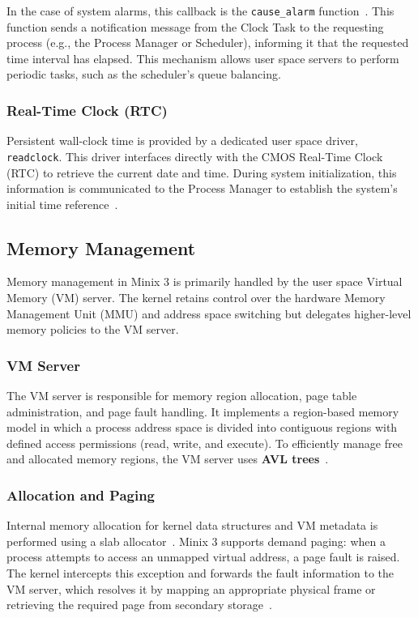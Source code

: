 \documentclass[a4paper,10pt,twoside]{report}
\theoremstyle{definition}
\begin{document}
In the case of system alarms, this callback is the \texttt{cause\_alarm} function~\cite{minix_do_setalarm}. This function sends a notification message from the Clock Task to the requesting process (e.g., the Process Manager or Scheduler), informing it that the requested time interval has elapsed. This mechanism allows user space servers to perform periodic tasks, such as the scheduler's queue balancing.

\subsubsection{Real-Time Clock (RTC)}
Persistent wall-clock time is provided by a dedicated user space driver, \texttt{readclock}. This driver interfaces directly with the CMOS Real-Time Clock (RTC) to retrieve the current date and time. During system initialization, this information is communicated to the Process Manager to establish the system's initial time reference~\cite{minix_readclock}.

\subsection{Memory Management}
Memory management in Minix 3 is primarily handled by the user space Virtual Memory (VM) server. The kernel retains control over the hardware Memory Management Unit (MMU) and address space switching but delegates higher-level memory policies to the VM server.

\subsubsection{VM Server}
The VM server is responsible for memory region allocation, page table administration, and page fault handling. It implements a region-based memory model in which a process address space is divided into contiguous regions with defined access permissions (read, write, and execute). To efficiently manage free and allocated memory regions, the VM server uses \textbf{AVL trees}~\cite{minix_vm}.

\subsubsection{Allocation and Paging}
Internal memory allocation for kernel data structures and VM metadata is performed using a slab allocator~\cite{slab_allocation}. Minix 3 supports demand paging: when a process attempts to access an unmapped virtual address, a page fault is raised. The kernel intercepts this exception and forwards the fault information to the VM server, which resolves it by mapping an appropriate physical frame or retrieving the required page from secondary storage~\cite{shenoy_lecture}.
\end{document}
